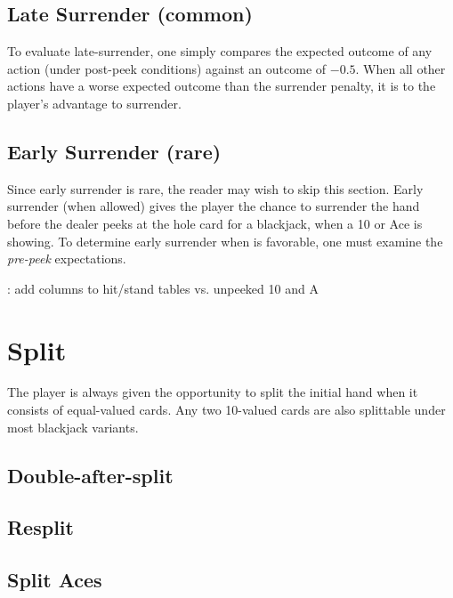 \subsection{Late Surrender (common)}
\label{sec:basic:surrender:late}
To evaluate late-surrender, one simply compares the expected outcome
of any action (under post-peek conditions) against an outcome of $-0.5$.
When all other actions have a worse expected outcome than the surrender
penalty, it is to the player's advantage to surrender.

\subsection{Early Surrender (rare)}
\label{sec:basic:surrender:early}
Since early surrender is rare, the reader may wish to skip this section.
Early surrender (when allowed) gives the player the chance
to surrender the hand before the dealer peeks at the hole card
for a blackjack, when a 10 or Ace is showing.
To determine early surrender when is favorable, 
one must examine the \emph{pre-peek} expectations.

\TODO: add columns to hit/stand tables vs. unpeeked 10 and A

\section{Split}
\label{sec:basic:split}

The player is always given the opportunity to split
the initial hand when it consists of equal-valued cards.
Any two 10-valued cards are also splittable under most blackjack variants.

\subsection{Double-after-split}
\label{sec:basic:DAS}


\subsection{Resplit}
\label{sec:basic:resplit}


\subsection{Split Aces}
\label{sec:basic:split-aces}

